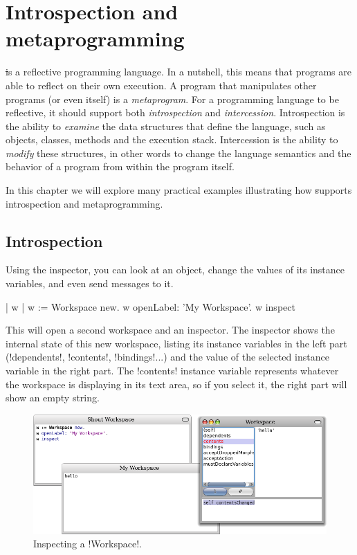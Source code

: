 \documentclass[a4paper,10pt,twoside]{book}
\begin{document}
	\sloppy
\fi
\chapter{Introspection and metaprogramming}\label{cha:metaprog}


\st is a reflective programming language.
In a nutshell, this means that programs are able to reflect on their own execution.
A program that manipulates other programs (or even itself) is a \emph{metaprogram}.
For a programming language to be reflective, it should support both \emph{introspection} and \emph{intercession}.
Introspection is the ability to \emph{examine} the data structures that define the language, such as objects, classes, methods and the execution stack.
Intercession is the ability to \emph{modify} these structures, in other words to change the language semantics and the behavior of a program from within the program itself.

In this chapter we will explore many practical examples illustrating how \st supports introspection and metaprogramming.

\section{Introspection}

Using the inspector, you can look at an object, change the values of its instance variables, and even send messages to it.

\begin{code}{| w |}
w := Workspace new.
w openLabel: 'My Workspace'.
w inspect
\end{code}

This will open a second workspace and an inspector.
The inspector shows the internal state of this new workspace, listing its instance variables in the left part (\ct!dependents!, \ct!contents!, \ct!bindings!...) and the value of the selected instance variable in the right part.
The \ct!contents! instance variable represents whatever the workspace is displaying in its text area, so if you select it, the right part will show an empty string.

\begin{figure}[ht]\centering
	\includegraphics[width=\linewidth]{workspaceInspector}
	\caption{Inspecting a \ct!Workspace!.\label{fig:workspaceInspector}}
\end{figure}
\end{document}
